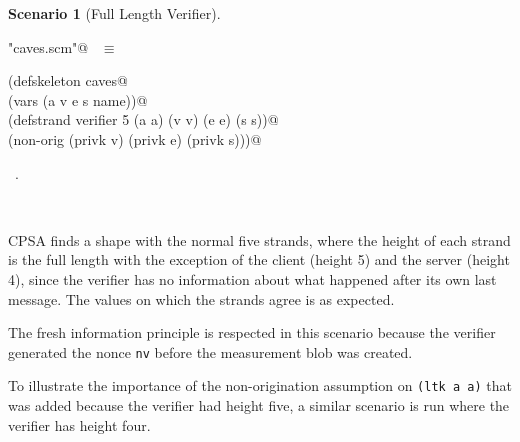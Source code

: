 \documentclass[titlepage,12pt]{article}
\theoremstyle{definition}
\newtheorem{scenario}{Scenario}
\begin{document}
\begin{scenario}[Full Length Verifier]\label{scene:full length verifier}
\begin{flushleft} \small
\begin{minipage}{\linewidth} \label{scrap24}
\verb@"caves.scm"@\nobreak\ {\footnotesize {} }$\equiv$
\vspace{-1ex}
\begin{list}{}{} \item
\mbox{}\verb@(defskeleton caves@\\
\mbox{}\verb@  (vars (a v e s name))@\\
\mbox{}\verb@  (defstrand verifier 5 (a a) (v v) (e e) (s s))@\\
\mbox{}\verb@  (non-orig (privk v) (privk e) (privk s)))@{\NWsep}
\end{list}
\vspace{-1ex}
\footnotesize\addtolength{\baselineskip}{-1ex}
\begin{list}{}{\setlength{\itemsep}{-\parsep}\setlength{\itemindent}{-\leftmargin}}
\item \NWtxtFileDefBy\ .
\end{list}
\end{minipage}\\[4ex]
\end{flushleft}
\end{scenario}

CPSA finds a shape with the normal five strands, where the height of
each strand is the full length with the exception of the client
(height 5) and the server (height 4), since the verifier has no
information about what happened after its own last message.  The
values on which the strands agree is as expected.

The fresh information principle is respected in this scenario because
the verifier generated the nonce \texttt{nv} before the measurement
blob was created.

To illustrate the importance of the non-origination assumption on
\texttt{(ltk a a)} that was added because the verifier had height
five, a similar scenario is run where the verifier has height four.
\end{document}
